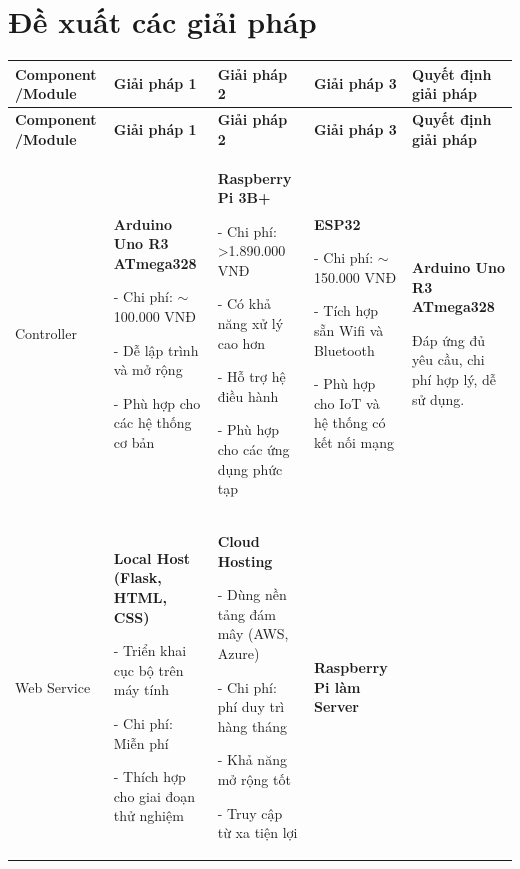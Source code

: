 \section{Đề xuất các giải pháp}
{%
\centering
\small
\begin{longtable}{|p{2.3cm}|p{3.2cm}|p{3.2cm}|p{3.2cm}|p{3.5cm}|}
\hline
\textbf{Component /Module} & \textbf{Giải pháp 1} & \textbf{Giải pháp 2} & \textbf{Giải pháp 3} & \textbf{Quyết định giải pháp} \\ \hline
\endfirsthead

\hline
\textbf{Component /Module} & \textbf{Giải pháp 1} & \textbf{Giải pháp 2} & \textbf{Giải pháp 3} & \textbf{Quyết định giải pháp} \\ \hline
\endhead

\hline
Controller 
& \textbf{Arduino Uno R3 ATmega328}


- Chi phí: $\sim$100.000 VNĐ


- Dễ lập trình và mở rộng


- Phù hợp cho các hệ thống cơ bản & \textbf{Raspberry Pi 3B+}


- Chi phí: \textgreater{}1.890.000 VNĐ


- Có khả năng xử lý cao hơn


- Hỗ trợ hệ điều hành


- Phù hợp cho các ứng dụng phức tạp & \textbf{ESP32}


- Chi phí: $\sim$150.000 VNĐ


- Tích hợp sẵn Wifi và Bluetooth


- Phù hợp cho IoT và hệ thống có kết nối mạng

& \textbf{Arduino Uno R3 ATmega328}


Đáp ứng đủ yêu cầu, chi phí hợp lý, dễ sử dụng. \\ \hline

Web Service 

& \textbf{Local Host (Flask, HTML, CSS)}


- Triển khai cục bộ trên máy tính


- Chi phí: Miễn phí


- Thích hợp cho giai đoạn thử nghiệm & \textbf{Cloud Hosting}


- Dùng nền tảng đám mây (AWS, Azure)


- Chi phí: phí duy trì hàng tháng


- Khả năng mở rộng tốt


- Truy cập từ xa tiện lợi & \textbf{Raspberry Pi làm Server}



\end{longtable}}
